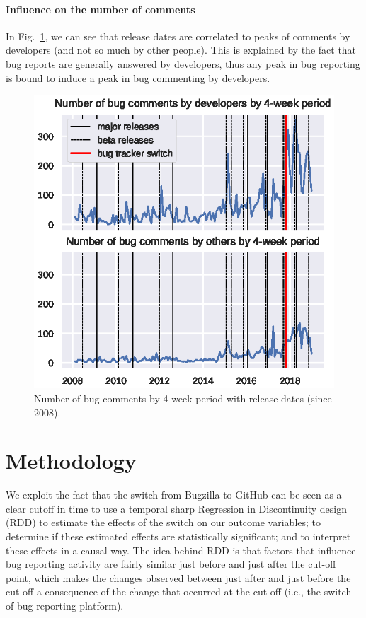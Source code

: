 \documentclass[conference]{IEEEtran}
\begin{document}
\paragraph{Influence on the number of comments}
In Fig.~\ref{comments_with_releases}, we can see that release dates are correlated to peaks of comments by developers (and not so much by other people). This is explained by the fact that bug reports are generally answered by developers, thus any peak in bug reporting is bound to induce a peak in bug commenting by developers.

\begin{figure}
\includegraphics{comments_with_releases.eps}
\caption{Number of bug comments by 4-week period with release dates (since 2008).} \label{comments_with_releases}
\end{figure}

\section{Methodology}
\label{methodology}

We exploit the fact that the switch from Bugzilla to GitHub can be seen as a clear cutoff in time to use a temporal sharp Regression in Discontinuity design (RDD) to estimate the effects of the switch on our outcome variables; to determine if these estimated effects are statistically significant; and to interpret these effects in a causal way. 
The idea behind RDD is that factors that influence bug reporting activity are fairly similar just before and just after the cut-off point, which makes the changes observed between just after and just before the cut-off a consequence of the change that occurred at the cut-off (i.e., the switch of bug reporting platform).
\end{document}
